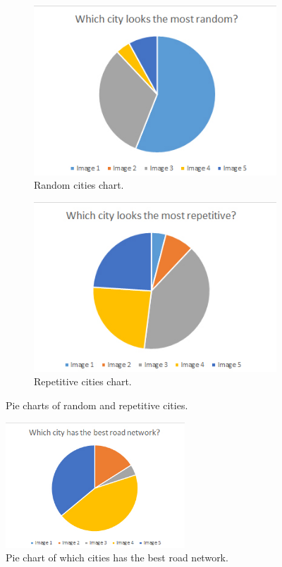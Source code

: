 \begin{figure}[h]
	\begin{subfigure}{0.5\textwidth}
		\centering
		\includegraphics[width=0.9\linewidth]{"Images/Random"}
		\caption{Random cities chart.}
		\label{fig:pie-chart-least-natural}
	\end{subfigure}
	\begin{subfigure}{0.5\textwidth}
		\centering
		\includegraphics[width=0.9\linewidth]{"Images/Repetitive"}
		\caption{Repetitive cities chart.}
		\label{fig:pie-chart-natural}
	\end{subfigure}
	\caption{Pie charts of random and repetitive cities.}
	\label{fig:pie-chart-natural-least-natural}
\end{figure}

	\begin{figure}
		\centering
		\includegraphics[width=0.6\textwidth]{"Images/RoadNetwork"}
		\caption{Pie chart of which cities has the best road network.}
		\label{fig:pie-chart-often-play}
	\end{figure}